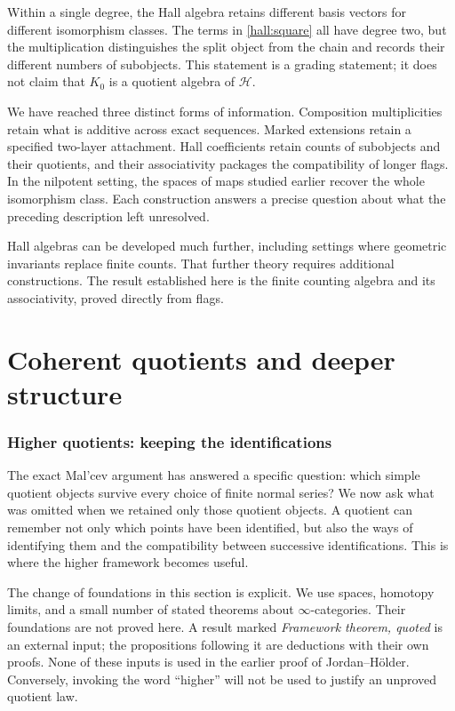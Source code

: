 \documentclass[11pt]{article}
\theoremstyle{definition}
\theoremstyle{remark}\newtheorem{remark}[theorem]{Remark}
\begin{document}
Within a single degree, the Hall algebra retains different basis vectors
for different isomorphism classes. The terms in \eqref{hall:square} all
have degree two, but the multiplication distinguishes the split object
from the chain and records their different numbers of subobjects.
This statement is a grading statement; it does not claim that $K_0$ is
a quotient algebra of $\mathcal H$.

We have reached three distinct forms of information. Composition
multiplicities retain what is additive across exact sequences.
Marked extensions retain a specified two-layer attachment. Hall
coefficients retain counts of subobjects and their quotients, and their
associativity packages the compatibility of longer flags. In the
nilpotent setting, the spaces of maps studied earlier recover the whole
isomorphism class. Each construction answers a precise question about
what the preceding description left unresolved.

Hall algebras can be developed much further, including settings where
geometric invariants replace finite counts. That further theory requires
additional constructions. The result established here is the finite
counting algebra and its associativity, proved directly from flags.


\clearpage\part{Coherent quotients and deeper structure}

\section{Higher quotients: keeping the identifications}
\label{h:chapter}

The exact Mal'cev argument has answered a specific question: which simple
quotient objects survive every choice of finite normal series?  We now ask
what was omitted when we retained only those quotient objects.  A quotient
can remember not only which points have been identified, but also the ways
of identifying them and the compatibility between successive identifications.
This is where the higher framework becomes useful.

The change of foundations in this section is explicit.  We use spaces,
homotopy limits, and a small number of stated theorems about
$\infty$-categories.  Their foundations are not proved here.  A result marked
\emph{Framework theorem, quoted} is an external input; the propositions
following it are deductions with their own proofs.  None of these inputs
is used in the earlier proof of Jordan--H\"older.  Conversely, invoking the
word ``higher'' will not be used to justify an unproved quotient law.
\end{document}
